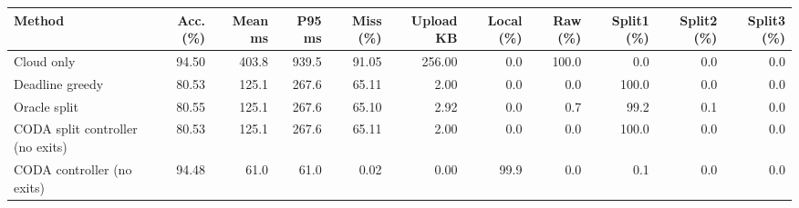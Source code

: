 \begin{tabular}{lrrrrrrrrrr}
\toprule
Method & Acc. (\%) & Mean ms & P95 ms & Miss (\%) & Upload KB & Local (\%) & Raw (\%) & Split1 (\%) & Split2 (\%) & Split3 (\%) \\
\midrule
Cloud only & 94.50 & 403.8 & 939.5 & 91.05 & 256.00 & 0.0 & 100.0 & 0.0 & 0.0 & 0.0 \\
Deadline greedy & 80.53 & 125.1 & 267.6 & 65.11 & 2.00 & 0.0 & 0.0 & 100.0 & 0.0 & 0.0 \\
Oracle split & 80.55 & 125.1 & 267.6 & 65.10 & 2.92 & 0.0 & 0.7 & 99.2 & 0.1 & 0.0 \\
CODA split controller (no exits) & 80.53 & 125.1 & 267.6 & 65.11 & 2.00 & 0.0 & 0.0 & 100.0 & 0.0 & 0.0 \\
CODA controller (no exits) & 94.48 & 61.0 & 61.0 & 0.02 & 0.00 & 99.9 & 0.0 & 0.1 & 0.0 & 0.0 \\
\bottomrule
\end{tabular}
